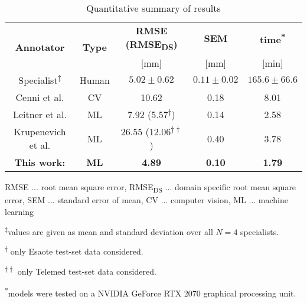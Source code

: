 \documentclass[journal,twoside,web]{ieeecolor}
\begin{document}
 \setlength{\tabcolsep}{0.32em}
\begin{table}[t!]
\caption{Quantitative summary of results}
\label{tab:Results}
\begin{center}
    \vspace{-0.2cm} 
    \renewcommand{\arraystretch}{1.20}
    \begin{tabular}{ccccc}
        \toprule
           \multirow{2}{*}{\textbf{Annotator}}
            &\multirow{2}{*}{\textbf{Type}}
            &\textbf{RMSE (RMSE\textsubscript{DS})}    
            &\textbf{SEM}
            &\textbf{time\textsuperscript{*}}\\
&
            &[mm]
            &[mm]
            &[min]\\
        \midrule
            \cellcolor{Gray}Specialist\textsuperscript{$\ddagger$} 
            &\cellcolor{Gray}Human
            &\cellcolor{Gray}$5.02 \pm0.62$   
            &\cellcolor{Gray}$0.11 \pm0.02$
            &\cellcolor{Gray}$165.6 \pm66.6$\\
Cenni et al. \cite{j:Cenni2019} 
            &CV
            &10.62
            &0.18
            &8.01\\
Leitner et al. \cite{c:LeitnerJarolim2020}    
            &ML
            &7.92 (5.57\textsuperscript{$\dagger$})
            &0.14
            &2.58\\
Krupenevich et al. \cite{j:Krupenevich2021}    
            &ML
            &26.55 (12.06\textsuperscript{$\dagger\dagger$})
            &0.40
            &3.78\\
\textbf{This work:} 
            &\textbf{ML}
            &\textbf{4.89}
            &\textbf{0.10}
            &\textbf{1.79}\\
\bottomrule
\end{tabular}
    \begin{tablenotes}\footnotesize
    \item RMSE ... root mean square error, RMSE\textsubscript{DS} ... domain specific root mean square error, SEM ... standard error of mean, CV ... computer vision, ML ... machine learning
    \item \textsuperscript{$\ddagger$}values are given as mean and standard deviation over all $N=4$ specialists.
    \item \textsuperscript{$\dagger$} only Esaote test-set data considered.
    \item \textsuperscript{$\dagger\dagger$} only Telemed test-set data considered.
    \item \textsuperscript{*}models were tested on a NVIDIA GeForce RTX 2070 graphical processing unit.
    \end{tablenotes}
\end{center}
\vspace{-0.3cm}
\end{table}
\vspace{0.5cm}
 
\end{document}
